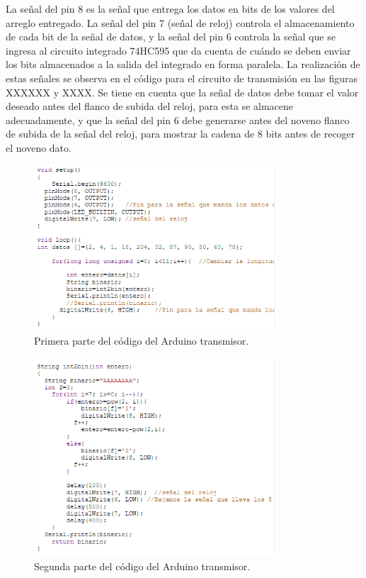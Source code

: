 \documentclass{article}
\begin{document}
La señal del pin 8 es la señal que entrega los datos en bits de los valores del arreglo entregado. La señal del pin 7 (señal de reloj) controla el almacenamiento de cada bit de la señal de datos, y la señal del pin 6 controla la señal que se ingresa al circuito integrado 74HC595 que da cuenta de cuándo se deben enviar los bits almacenados a la salida del integrado en forma paralela. La realización de estas señales se observa en el código para el circuito de transmisión en las figuras XXXXXX y XXXX. Se tiene en cuenta que la señal de datos debe tomar el valor deseado antes del flanco de subida del reloj, para esta se almacene adecuadamente, y que la señal del pin 6 debe generarse antes del noveno flanco de subida de la señal del reloj, para mostrar la cadena de 8 bits antes de recoger el noveno dato.\\


\begin{figure}[h]
\includegraphics[width=9cm]{codigo_transmisor_1.PNG}
\centering
\caption{Primera parte del código del Arduino transmisor.}
\label{fig:codigo_transmisor_1.PNG}
\end{figure}


\begin{figure}[h]
\includegraphics[width=9cm]{codigo_transmisor_2.PNG}
\centering
\caption{Segunda parte del código del Arduino transmisor.}
\label{fig:codigo_transmisor_2.PNG}
\end{figure}
\end{document}
